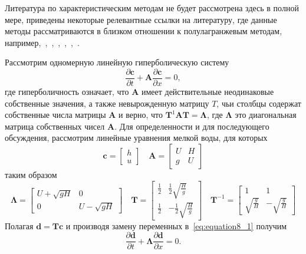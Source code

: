 Литература по характеристическим методам не будет рассмотрена здесь в полной мере, приведены некоторые релевантные ссылки на литературу, где данные методы рассматриваются в близком отношении к полулагранжевым методам, например,~\cite{A17},~\cite{A18},~\cite{A19},~\cite{A41},~\cite{A42},~\cite{A44}.

Рассмотрим одномерную линейную гиперболическую систему
%
\begin{equation}
\label{eq:equation8_1}
\frac{\partial\mathbf{c}}{\partial t} + \mathbf{A}\frac{\partial \mathbf{c}}{\partial{x}} = 0,
\end{equation}
%
где гиперболичность означает, что $\mathbf{A}$ имеет действительные неодинаковые собственные значения, а также невырожденную матрицу $T$, чьи столбцы содержат собственные числа матрицы $\mathbf{A}$ и верно, что 
$\mathbf{T}^1\mathbf{A}\mathbf{T}=\mathbf{\Lambda}$, где $\mathbf{\Lambda}$ это диагональная матрица собственных чисел $\mathbf{A}$. Для определенности и для последующего обсуждения, рассмотрим линейные уравнения мелкой воды, для которых
%
\begin{equation*}
\mathbf{c} = \begin{bmatrix}
h \\
u
\end{bmatrix}
 \quad
\mathbf{A} = \begin{bmatrix}
	U & H\\
	g & U
\end{bmatrix}
\end{equation*}
%
таким образом
%
\begin{equation*}
\mathbf{\Lambda} = \begin{bmatrix}
U + \sqrt{gH} & 0\\
0 & U - \sqrt{gH}
\end{bmatrix}
\quad
\mathbf{T} = \begin{bmatrix}
\frac{1}{2} & \frac{1}{2}\sqrt{\frac{H}{g}}\\
\frac{1}{2}  & -\frac{1}{2} \sqrt{\frac{H}{g}}
\end{bmatrix}
\quad
\mathbf{T}^{-1} = \begin{bmatrix}
1 & 1\\
\sqrt{\frac{g}{H}}  & -\sqrt{\frac{g}{H}}
\end{bmatrix}
\end{equation*}
%
Полагая $\mathbf{d}=\mathbf{T}\mathbf{c}$ и производя замену переменных в~\eqref{eq:equation8_1} получим
%
\begin{equation}
\label{eq:equation8_2}
\frac{\partial\mathbf{d}}{\partial t} + \mathbf{\Lambda}\frac{\partial \mathbf{d}}{\partial{x}} = 0.
\end{equation}
